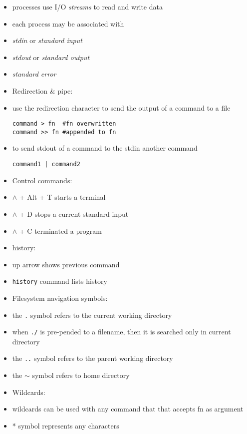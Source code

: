 \documentclass[twocolumn]{IEEEtran} %
\begin{document}
\begin{itemize}
    \bi
        \item processes use I/O \emph{streams} to read and write data
        \item each process may be associated with
        \bi
            \item \emph{stdin} or \emph{standard input}
            \item \emph{stdout} or \emph{standard output}
            \item \emph{standard error}
        \ei
    \ei
    \item Redirection \& pipe:
    \bi
        \item use the redirection character to send the output of a command to a file
        \begin{verbatim}
command > fn  #fn overwritten
command >> fn #appended to fn
        \end{verbatim}
        \item to send stdout of a command to the stdin another command
        \begin{verbatim}
command1 | command2
        \end{verbatim}
    \ei
    \item Control commands:
    \bi
        \item $\wedge$ + Alt + T starts a terminal
        \item $\wedge$ + D stops a current standard input
        \item $\wedge$ + C terminated a program
    \ei
    \item history:
    \bi
	   \item up arrow shows previous command
	   \item \verb|history| command lists history
    \ei
    \item Filesystem navigation symbols:
    \bi
        \item the \verb|.| symbol refers to the current working directory
        \bi
            \item when  \verb|./| is pre-pended to a filename, then it is searched only in current directory
        \ei
	    \item the \verb|..| symbol refers to the parent working directory
        \item the $\sim$ symbol refers to home directory
    \ei
    \item Wildcards:
    \bi
        \item wildcards can be used with any command that that accepts fn as argument
        \item * symbol represents any characters

\end{itemize}
\end{document}
